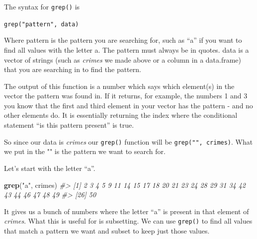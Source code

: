 \documentclass[
  12pt,
]{book}
\newenvironment{Shaded}{\begin{snugshade}}{\end{snugshade}}
\newcommand{\CommentTok}[1]{\textcolor[rgb]{0.37,0.37,0.37}{\textit{#1}}}
\newcommand{\KeywordTok}[1]{\textcolor[rgb]{0.27,0.27,0.27}{\textbf{#1}}}
\newcommand{\NormalTok}[1]{#1}
\newcommand{\StringTok}[1]{\textcolor[rgb]{0.5,0.5,0.5}{#1}}
\begin{document}
The syntax for \texttt{grep()} is

\texttt{grep("pattern",\ data)}

Where pattern is the pattern you are searching for, such as ``a'' if you want to find all values with the letter a. The pattern must always be in quotes. data is a vector of strings (such as \emph{crimes} we made above or a column in a data.frame) that you are searching in to find the pattern.

The output of this function is a number which says which element(s) in the vector the pattern was found in. If it returns, for example, the numbers 1 and 3 you know that the first and third element in your vector has the pattern - and no other elements do. It is essentially returning the index where the conditional statement ``is this pattern present'' is true.

So since our data is \emph{crimes} our \texttt{grep()} function will be \texttt{grep("",\ crimes)}. What we put in the "" is the pattern we want to search for.

Let's start with the letter ``a''.

\begin{Shaded}
\begin{Highlighting}[]
\KeywordTok{grep}\NormalTok{(}\StringTok{"a"}\NormalTok{, crimes)}
\CommentTok{\#\textgreater{}  [1]  2  3  4  5  9 11 14 15 17 18 20 21 23 24 28 29 31 34 42 43 44 46 47 48 49}
\CommentTok{\#\textgreater{} [26] 50}
\end{Highlighting}
\end{Shaded}

It gives us a bunch of numbers where the letter ``a'' is present in that element of \emph{crimes}. What this is useful for is subsetting. We can use \texttt{grep()} to find all values that match a pattern we want and subset to keep just those values.
\end{document}
